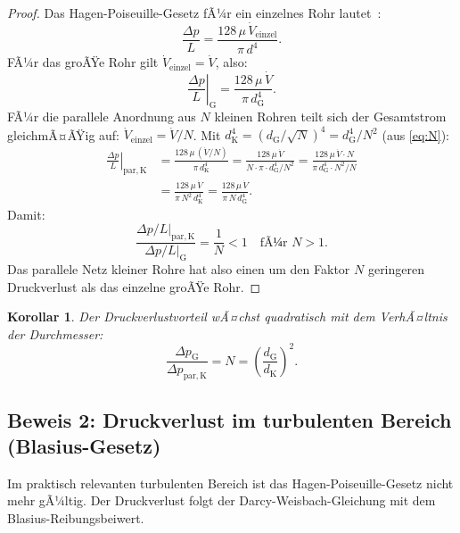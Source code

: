 ﻿\documentclass[12pt,a4paper,twoside]{article}
\theoremstyle{plain}
\newtheorem{corollary}[theorem]{Korollar}
\theoremstyle{definition}
\theoremstyle{remark}
\newcommand{\dG}{d_{\mathrm{G}}}
\newcommand{\dK}{d_{\mathrm{K}}}
\begin{document}
\begin{proof}
Das Hagen-Poiseuille-Gesetz fÃ¼r ein einzelnes Rohr lautet~\cite{White2016}:
\begin{equation}
  \frac{\Delta p}{L} = \frac{128\,\mu\,\dot{V}_{\mathrm{einzel}}}{\pi\,d^4}.
  \label{eq:hp}
\end{equation}
FÃ¼r das groÃŸe Rohr gilt $\dot{V}_{\mathrm{einzel}} = \dot{V}$, also:
\begin{equation}
  \left.\frac{\Delta p}{L}\right|_{\mathrm{G}}
    = \frac{128\,\mu\,\dot{V}}{\pi\,\dG^4}.
\end{equation}
FÃ¼r die parallele Anordnung aus $N$ kleinen Rohren teilt sich der Gesamtstrom
gleichmÃ¤ÃŸig auf: $\dot{V}_{\mathrm{einzel}} = \dot{V}/N$.
Mit $\dK^4 = \left(\dG/\sqrt{N}\right)^4 = \dG^4/N^2$ (aus \cref{eq:N}):
\begin{align}
  \left.\frac{\Delta p}{L}\right|_{\mathrm{par, K}}
    &= \frac{128\,\mu\,(\dot{V}/N)}{\pi\,\dK^4}
     = \frac{128\,\mu\,\dot{V}}{N \cdot \pi \cdot \dG^4/N^2}
     = \frac{128\,\mu\,\dot{V} \cdot N}{\pi\,\dG^4 \cdot N^2 / N}
     \nonumber \\
    &= \frac{128\,\mu\,\dot{V}}{\pi\,N^2\,\dK^4}
     = \frac{128\,\mu\,\dot{V}}{\pi\,N\,\dG^4}.
\end{align}
Damit:
\begin{equation}
  \frac{\left.\Delta p/L\right|_{\mathrm{par,K}}}
       {\left.\Delta p/L\right|_{\mathrm{G}}}
  = \frac{1}{N} < 1 \quad \text{fÃ¼r } N > 1.
\end{equation}
Das parallele Netz kleiner Rohre hat also einen um den Faktor $N$ geringeren
Druckverlust als das einzelne groÃŸe Rohr.
\end{proof}

\begin{corollary}
\label{cor:druckverlust_lam}
Der Druckverlustvorteil wÃ¤chst quadratisch mit dem VerhÃ¤ltnis der Durchmesser:
\begin{equation}
  \frac{\Delta p_{\mathrm{G}}}{\Delta p_{\mathrm{par,K}}}
  = N = \left(\frac{\dG}{\dK}\right)^2.
\end{equation}
\end{corollary}

\subsection{Beweis 2: Druckverlust im turbulenten Bereich (Blasius-Gesetz)}
\label{ssec:beweis_turb}

Im praktisch relevanten turbulenten Bereich ist das Hagen-Poiseuille-Gesetz
nicht mehr gÃ¼ltig.
Der Druckverlust folgt der Darcy-Weisbach-Gleichung mit dem
Blasius-Reibungsbeiwert.
\end{document}
